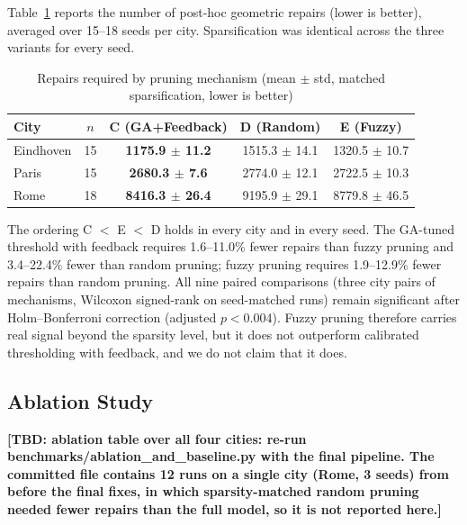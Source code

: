 \documentclass[journal]{IEEEtran}
\newcommand{\tbd}[1]{\textbf{[TBD: #1]}}
\begin{document}
Table~\ref{tab:fuzzy-results} reports the number of post-hoc geometric repairs (lower is better), averaged over 15--18 seeds per city. Sparsification was identical across the three variants for every seed.

\begin{table}[h]
\centering
\caption{Repairs required by pruning mechanism (mean $\pm$ std, matched sparsification, lower is better)}
\begin{tabular}{lcccc}
\toprule
City & $n$ & \textbf{C (GA+Feedback)} & D (Random) & E (Fuzzy) \\
\midrule
Eindhoven & 15 & \textbf{1175.9 $\pm$ 11.2} & 1515.3 $\pm$ 14.1 & 1320.5 $\pm$ 10.7 \\
Paris     & 15 & \textbf{2680.3 $\pm$ 7.6}  & 2774.0 $\pm$ 12.1 & 2722.5 $\pm$ 10.3 \\
Rome      & 18 & \textbf{8416.3 $\pm$ 26.4} & 9195.9 $\pm$ 29.1 & 8779.8 $\pm$ 46.5 \\
\bottomrule
\end{tabular}
\label{tab:fuzzy-results}
\end{table}

The ordering C $<$ E $<$ D holds in every city and in every seed. The GA-tuned threshold with feedback requires 1.6--11.0\% fewer repairs than fuzzy pruning and 3.4--22.4\% fewer than random pruning; fuzzy pruning requires 1.9--12.9\% fewer repairs than random pruning. All nine paired comparisons (three city pairs of mechanisms, Wilcoxon signed-rank on seed-matched runs) remain significant after Holm--Bonferroni correction (adjusted $p < 0.004$). Fuzzy pruning therefore carries real signal beyond the sparsity level, but it does not outperform calibrated thresholding with feedback, and we do not claim that it does.

\subsection{Ablation Study}
\label{sec:ablation}
\tbd{ablation table over all four cities: re-run benchmarks/ablation\_and\_baseline.py with the final pipeline. The committed file contains 12 runs on a single city (Rome, 3 seeds) from before the final fixes, in which sparsity-matched random pruning needed fewer repairs than the full model, so it is not reported here.}
\end{document}
